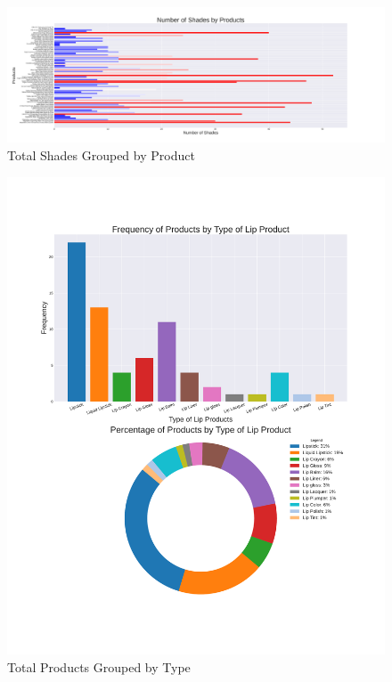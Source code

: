 \documentclass{article}
\begin{document}
\begin{center}
    \begin{landscape}
        \begin{figure}[htbp]
            \centering
            \includegraphics[scale=0.49]{../images/India-graphs/TotalShadesByProduct.pdf}
            \caption{Total Shades Grouped by Product}
            \label{Shades_by_Product_ind}
        \end{figure}
    \end{landscape}

    \begin{figure}[htbp]
        \centering
        \includegraphics[scale=0.44]{../images/India-graphs/TotalProductsbyType.pdf}
        \caption{Total Products Grouped by Type}
        \label{Products_by_Type_ind}
    \end{figure}


\end{center}
\end{document}
